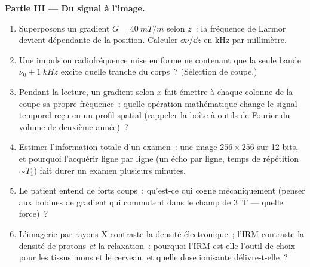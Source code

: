 \begin{problem}
\medskip\noindent\textbf{Partie III --- Du signal à l'image.}
\begin{enumerate}[resume]
  \item Superposons un gradient $G = \qty{40}{mT/m}$ selon $z$~: la
        fréquence de Larmor devient dépendante de la position.
        Calculer $\dd\nu/\dd z$ en kHz par millimètre.
  \item Une impulsion radiofréquence mise en forme ne contenant que
        la seule bande $\nu_0 \pm
        \qty{1}{kHz}$ excite quelle tranche du corps~? (Sélection de
        coupe.)
  \item Pendant la lecture, un gradient selon $x$ fait émettre à
        chaque colonne de la coupe sa propre fréquence~: quelle
        opération mathématique change le signal temporel reçu en un
        profil spatial (rappeler la boîte à outils de Fourier du
        volume de deuxième année)~?
  \item Estimer l'information totale d'un examen~: une image
        $256 \times 256$ sur 12 bits, et pourquoi l'acquérir ligne
        par ligne (un écho par ligne, temps de répétition
        $\sim T_1$) fait durer un examen plusieurs minutes.
  \item Le patient entend de forts coups~: qu'est-ce qui cogne
        mécaniquement (penser aux bobines de gradient qui commutent
        dans le champ de \qty{3}{T} --- quelle force)~?
  \item L'imagerie par rayons X contraste la densité électronique~;
        l'IRM contraste la densité de protons \emph{et} la
        relaxation~: pourquoi l'IRM est-elle l'outil de choix pour
        les tissus mous et le cerveau, et quelle dose ionisante
        délivre-t-elle~?
\end{enumerate}


\end{problem}
